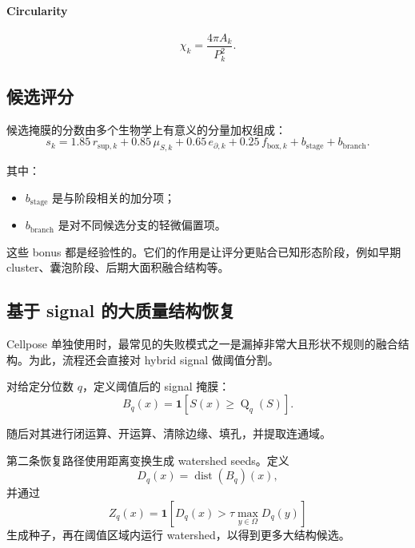 \documentclass[11pt]{article}
\newcommand{\1}{\mathbf{1}}
\newcommand{\quantile}{\operatorname{Q}}
\newcommand{\dist}{\operatorname{dist}}
\newcommand{\signal}{S}
\begin{document}
\paragraph{Circularity}
\begin{equation}
\chi_k = \frac{4\pi A_k}{P_k^2}.
\end{equation}

\subsection{候选评分}
候选掩膜的分数由多个生物学上有意义的分量加权组成：
\begin{equation}
s_k = 1.85\,r_{\mathrm{sup},k} + 0.85\,\mu_{\signal,k} + 0.65\,e_{\partial,k} + 0.25\,f_{\mathrm{box},k} + b_{\mathrm{stage}} + b_{\mathrm{branch}}.
\end{equation}

其中：
\begin{itemize}[leftmargin=1.5em]
  \item $b_{\mathrm{stage}}$ 是与阶段相关的加分项；
  \item $b_{\mathrm{branch}}$ 是对不同候选分支的轻微偏置项。
\end{itemize}

这些 bonus 都是经验性的。它们的作用是让评分更贴合已知形态阶段，例如早期 cluster、囊泡阶段、后期大面积融合结构等。

\subsection{基于 signal 的大质量结构恢复}
Cellpose 单独使用时，最常见的失败模式之一是漏掉非常大且形状不规则的融合结构。为此，流程还会直接对 hybrid signal 做阈值分割。

对给定分位数 $q$，定义阈值后的 signal 掩膜：
\begin{equation}
B_q(x) = \1[\signal(x) \ge \quantile_q(\signal)].
\end{equation}

随后对其进行闭运算、开运算、清除边缘、填孔，并提取连通域。

第二条恢复路径使用距离变换生成 watershed seeds。定义
\begin{equation}
D_q(x) = \dist(B_q)(x),
\end{equation}
并通过
\begin{equation}
Z_q(x) = \1\left[D_q(x) > \tau \max_{y\in\Omega} D_q(y)\right]
\end{equation}
生成种子，再在阈值区域内运行 watershed，以得到更多大结构候选。
\end{document}

